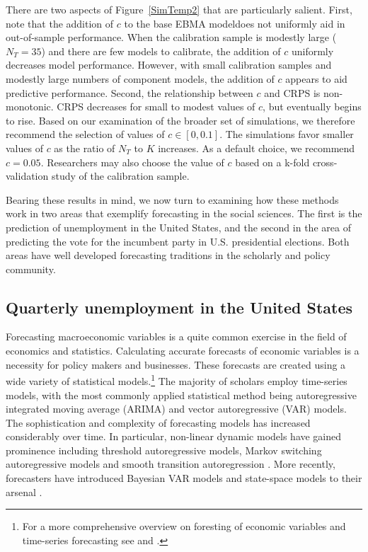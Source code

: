 \documentclass[12pt,fullpage,endnotes]{article}
\begin{document}
There are two aspects of Figure~\ref{SimTemp2} that are particularly
salient.  First, note that the addition of $c$ to the base EBMA
modeldoes not uniformly aid in out-of-sample performance.  When the
calibration sample is modestly large ($N_T=35$) and there are few
models to calibrate, the addition of $c$ uniformly decreases model
performance.  However, with small calibration samples and modestly
large numbers of component models, the addition of $c$ appears to aid
predictive performance.  Second, the relationship between $c$ and CRPS
is non-monotonic.  CRPS decreases for small to modest values of $c$,
but eventually begins to rise.  Based on our examination of the
broader set of simulations, we therefore recommend the selection of
values of $c \in [0, 0.1]$.  The simulations favor smaller values of
$c$ as the ratio of $N_T$ to $K$ increases.  As a default choice, we
recommend $c=0.05$.  Researchers may also choose the value of $c$
based on a k-fold cross-validation study of the calibration sample.

 Bearing these results in mind, we now turn to examining how these
methods work in two areas that exemplify forecasting in the social
sciences. The first is the prediction of unemployment in the United
States, and the second in the area of predicting the vote for the
incumbent party in U.S. presidential elections. Both areas have well
developed forecasting traditions in the scholarly and policy
community.


\subsection{Quarterly unemployment in the United States}
\label{econ}

Forecasting macroeconomic variables is a quite common exercise in the
field of economics and statistics. Calculating accurate forecasts of
economic variables is a necessity for policy makers and
businesses. These forecasts are created using a wide variety of
statistical models.\footnote{For a more comprehensive overview on
  foresting of economic variables and time-series forecasting see
  \citet{Elliott:Timmermann:2008} and \citet{Goijer:Hyndman:2006}.}
The majority of scholars employ time-series models, with the most
commonly applied statistical method being autoregressive integrated
moving average (ARIMA) and vector autoregressive (VAR) models. The
sophistication and complexity of forecasting models has increased
considerably over time. In particular, non-linear dynamic models have
gained prominence including threshold autoregressive models, Markov
switching autoregressive models and smooth transition autoregression
\citep{Elliott:Timmermann:2008,Montgomery:etal:1998}. More recently,
forecasters have introduced Bayesian VAR models and state-space models
to their arsenal \citep{Goijer:Hyndman:2006,Elliott:Timmermann:2008}.
\end{document}
